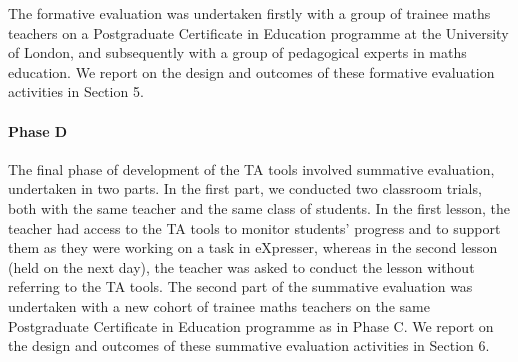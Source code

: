 The formative evaluation was undertaken firstly with a group of trainee
maths teachers on a Postgraduate Certificate in Education programme
at the University of London, and subsequently with a group of pedagogical 
experts in maths education. We report on the design and outcomes of these formative
evaluation activities in Section 5.

\paragraph{Phase D}
\label{sec:phase-d}
 
The final phase of development of the TA tools %
involved summative evaluation, undertaken in two parts. 
In the first part, we conducted two classroom trials, both with the same teacher
and the same class of students. In the first lesson, the teacher had access
to the TA tools to monitor students' progress and to support them 
as they were working on a task in eXpresser, whereas in the second lesson 
(held on the next day), the teacher was asked to conduct the lesson without 
referring to the TA tools. 
%
The second part of the summative evaluation was undertaken with a 
new cohort of trainee maths teachers on the same Postgraduate 
Certificate in Education programme as in Phase C.  
We report on the design and outcomes of these summative evaluation
activities in Section 6.

 

